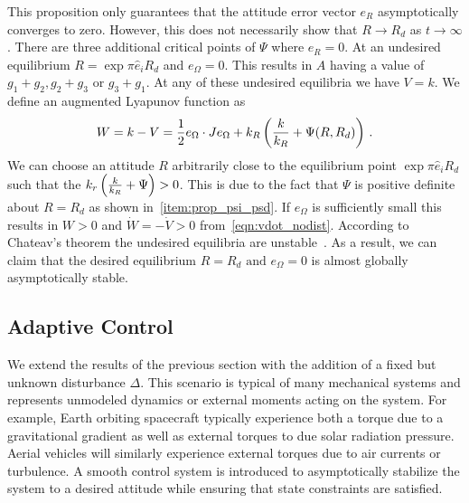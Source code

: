 \documentclass[letterpaper, 10 pt, conference]{ieeeconf}  %
\begin{document}
This proposition only guarantees that the attitude error vector \( e_R \) asymptotically converges to zero.
However, this does not necessarily show that \( R \to R_d \) as \( t \to \infty \). 
There are three additional critical points of \( \Psi \) where \( e_R = 0 \).
At an undesired equilibrium \( R = \exp{\pi \hat{e}_i} R_d \) and \( e_\Omega =0 \). 
This results in \( A \) having a value of \( g_1 + g_2, g_2 + g_3 \) or \( g_3 + g_1 \).
At any of these undesired equilibria we have \( V = k \). 
We define an augmented Lyapunov function as
\begin{align*}
	W = k - V = \frac{1}{2} e_\Omega \cdot J e_\Omega + k_R \left( \frac{k}{k_R}+ \Psi(R,R_d) \right) \, .
\end{align*}
We can choose an attitude \( R \) arbitrarily close to the equilibrium point \( \exp{ \pi \hat{e}_i} R_d \) such that the \( k_r \left( \frac{k}{k_R}+\Psi  \right)> 0 \).
This is due to the fact that \( \Psi \) is positive definite about \( R = R_d \) as shown in~\cref{item:prop_psi_psd}.
If \( e_\Omega \) is sufficiently small this results in \( W > 0 \) and \( \dot{W} = -\dot{V} > 0\) from~\cref{eqn:vdot_nodist}.
According to Chateav's theorem the undesired equilibria are unstable~\cite{khalil1996}.
As a result, we can claim that the desired equilibrium \( R = R_d \text{ and } e_\Omega = 0 \) is almost globally asymptotically stable.

\subsection{Adaptive Control}
We extend the results of the previous section with the addition of a fixed but unknown disturbance \( \Delta \).
This scenario is typical of many mechanical systems and represents unmodeled dynamics or external moments acting on the system.
For example, Earth orbiting spacecraft typically experience both a torque due to a gravitational gradient as well as external torques to due solar radiation pressure.
Aerial vehicles will similarly experience external torques due to air currents or turbulence.
A smooth control system is introduced to asymptotically stabilize the system to a desired attitude while ensuring that state constraints are satisfied.
\end{document}
